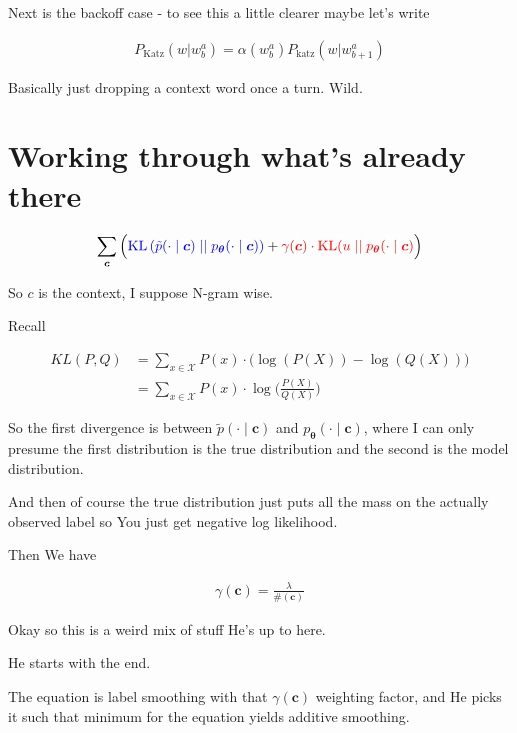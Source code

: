 \documentclass{article}
\newcommand{\KL}{\mathrm{KL}}
\newcommand{\uniform}{u}
\newcommand{\vtheta}{\boldsymbol{\theta}}
\newcommand{\model}{p_{\vtheta}}
\newcommand{\context}{\boldsymbol{c}}
\begin{document}
			Next is the backoff case - to see this a little clearer maybe let's write
			
			\begin{align}
				P_{\text{Katz}}(w|w^{a}_{b}) = \alpha(w^{a}_{b})P_{\text{katz}} (w|w^{a}_{b+1})
			\end{align}
			
			Basically just dropping a context word once a turn. Wild.
	
\newpage		
\section{Working through what's already there}

	\begin{align}
	   \sum_{\context} \Big( {\color{blue} \KL\left(\tilde{p}(\cdot 			\mid \context) \mid\mid \model(\cdot \mid \context)					\right)} + {\color{red}\gamma(\context) \cdot 						\KL(\uniform \mid\mid \model(\cdot \mid \context)}\Big)
	\end{align}
	
	So $c$ is the context, I suppose N-gram wise.
	
	Recall
	
	\begin{align}
			KL(P, Q) &= \sum_{x\in\mathcal{X}} P(x)\cdot\big(\log(P(X)) - \log(Q(X)) \big)\\
			&= \sum_{x\in\mathcal{X}} P(x)\cdot\log\bigg(\frac{P(X)}{Q(X)}\bigg)
	\end{align}
	
	So the first divergence is between $\tilde{p}(\cdot 			\mid \context)$ and $\model(\cdot \mid \context)$, where I can only presume the first distribution is the true distribution and the second is the model distribution. 
	
	And then of course the true distribution just puts all the mass on the actually observed label so You just get negative log likelihood.
	
	Then We have
	
	\begin{align}
		\gamma(\context) = \frac{\lambda}{\#(\context)}
	\end{align}
	
	Okay so this is a weird mix of stuff He's up to here.
	
	He starts with the end.
	
	The equation is label smoothing with that $\gamma(\context)$ weighting factor, and He picks it such that minimum for the equation yields additive smoothing.
	
\end{document}
